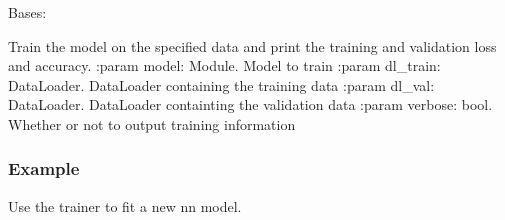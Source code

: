 \documentclass[letterpaper,10pt,english,openany,oneside]{sphinxmanual}
\begin{document}
\begin{fulllineitems}
\label{\detokenize{trainer:trainer.Trainer}}
Bases: 

\begin{fulllineitems}
\label{\detokenize{trainer:trainer.Trainer.fit}}
Train the model on the specified data and print the training and validation loss and accuracy.
:param model: Module. Model to train
:param dl\_train: DataLoader. DataLoader containing the training data
:param dl\_val: DataLoader. DataLoader containting the validation data
:param verbose: bool. Whether or not to output training information
\subsubsection*{Example}

Use the trainer to fit a new nn model.


\end{fulllineitems}
\end{fulllineitems}
\end{document}
